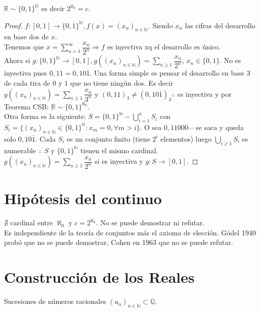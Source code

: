 \begin{theorem}
  $\mathbb{R} \sim \{ 0, 1 \}^\mathbb{N}$ es decir $2^{\aleph_0} = c$.
  \begin{proof}
    $f: [0, 1] \to \{ 0, 1 \}^\mathbb{N}, f(x) = (x_n)_{n \in \mathbb{N}}$. Siendo $x_n$ las cifras del desarrollo en base dos de $x$. \\
    Tenemos que $x = \sum_{n=1}^\infty \dfrac{x_n}{2^n} \Rightarrow f$ es inyectiva xq el desarrollo es único. \\
    Ahora si $g: \{ 0, 1 \}^\mathbb{N} \to [0, 1], g((x_n)_{n \in \mathbb{N}}) = \sum_{n \geq 1} \dfrac{x_n}{2^n}$, $x_n \in \{0, 1\}$. No es inyectiva pues $0,11 = 0,10\overline{1}$.
    Una forma simple es pensar el desarrollo en base $3$ de cada tira de $0$ y $1$ que no tiene ningún dos. Es decir $g((x_n)_{n \in \mathbb{N}}) = \sum_{n \geq 1} \dfrac{x_n}{3^n}$ y $(0,11)_3 \neq (0,10\overline{1})_3 \therefore$
    es inyectiva y por Teorema CSB: $\mathbb{R} \sim \{0,1\}^{\aleph_0}$. \\
    Otra forma es la siguiente:
    $S = \{0, 1\}^\mathbb{N} - \bigcup_{i=1}^n S_i$ con $S_i = \{ (x_n)_{n \in \mathbb{N}} \in \{0, 1\}^\mathbb{N} : x_m = 0, \forall m > i \}$. O sea $0,11000\cdots$ se saca y queda solo $0,10\overline{1}$.
    Cada $S_i$ es un conjunto finito (tiene $2^i$ elementos) luego $\bigcup_{i \geq 1} S_i$ es numerable $\therefore$ $S$ y $\{0,1\}^\mathbb{N}$ tienen el mismo cardinal. \\
    $g((x_n)_{n \in \mathbb{N}}) = \sum_{n \geq 1} \dfrac{x_n}{2^n}$ si es inyectiva y $g: S \to [0, 1]$.
  \end{proof}
\end{theorem}

\section{Hipótesis del continuo}

$\nexists$ cardinal entre $\aleph_0$ y $c = 2^{\aleph_0}$. No se puede demostrar ni refutar. \\
Es independiente de la teoría de conjuntos más el axioma de elección.
Gödel 1940 probó que no se puede demostrar, Cohen en 1963 que no se puede refutar.

\section{Construcción de los Reales}

Sucesiones de números racionales $(a_n)_{n \in \mathbb{N}} \subset \mathbb{Q}$. \\

